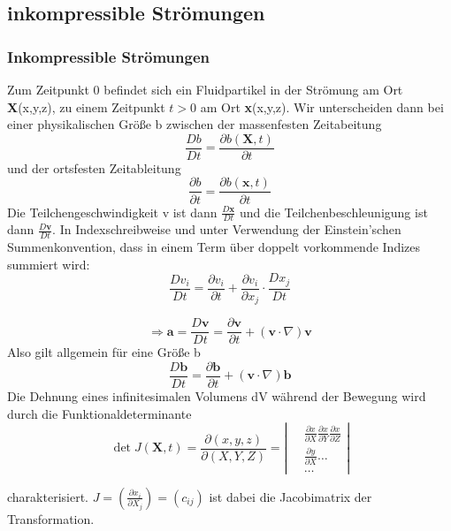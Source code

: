 \documentclass[
	11pt, %
]{beamer}
\begin{document}
		\subsection{inkompressible Str\"omungen}
\begin{frame}
	\frametitle{Inkompressible Str\"omungen}
		Zum Zeitpunkt 0 befindet sich ein Fluidpartikel in der Str\"omung am Ort \textbf{X}(x,y,z), zu einem Zeitpunkt $t>0$ am Ort \textbf{x}(x,y,z). Wir unterscheiden dann bei einer physikalischen Gr\"o{\ss}e b zwischen der massenfesten Zeitabeitung
		\begin{equation}
      \frac{Db}{Dt}=\frac{\partial b(\textbf{X}, t)}{\partial t} \label{mfza}
		\end{equation}
		und der ortsfesten Zeitableitung
		\begin{equation}
      \frac{\partial b}{\partial t}=\frac{\partial b(\textbf{x}, t)}{\partial t} \label{ofza}
		\end{equation}
		Die Teilchengeschwindigkeit v ist dann $\frac{D\textbf{x}}{Dt}$ und die Teilchenbeschleunigung ist dann $\frac{D\textbf{v}}{Dt}$. In Indexschreibweise und unter Verwendung der Einstein'schen Summenkonvention, dass in einem Term \"uber doppelt vorkommende Indizes summiert wird:
		\begin{equation}
			\frac{Dv_i}{Dt}=\frac{\partial v_i}{\partial t} + \frac{\partial v_i}{\partial x_j}\cdot \frac{Dx_j}{Dt} 
		\end{equation}

\end{frame}
\begin{frame}
		\begin{equation}
      \Rightarrow \textbf{a}=\frac{D\textbf{v}}{Dt}=\frac{\partial \textbf{v}}{\partial t}+\left(\textbf{v}\cdot\nabla\right)\textbf{v} \label{mfzat}
		\end{equation}
		Also gilt allgemein f\"ur eine Gr\"o{\ss}e b
		\begin{equation}
			\frac{D\textbf{b}}{Dt}=\frac{\partial \textbf{b}}{\partial t}+\left(\textbf{v}\cdot\nabla\right)\textbf{b}
		\end{equation}
		Die Dehnung eines infinitesimalen Volumens dV w\"ahrend der Bewegung wird durch die Funktionaldeterminante
		\begin{equation}
		\operatorname{det} J(\mathbf{X}, t)=\frac{\partial(x, y, z)}{\partial(X, Y, Z)}=\left\lvert\, \begin{aligned} & \frac{\partial x}{\partial X} \frac{\partial x}{\partial Y} \frac{\partial x}{\partial Z} \\ & \frac{\partial y}{\partial X} \ldots \\ & \ldots\end{aligned}\right\rvert
		\end{equation}

			charakterisiert. $J=\left(\frac{\partial x_i}{\partial X_j}\right)=\left(c_{i j}\right)$ ist dabei die Jacobimatrix der Transformation.
\end{frame}
\end{document}
